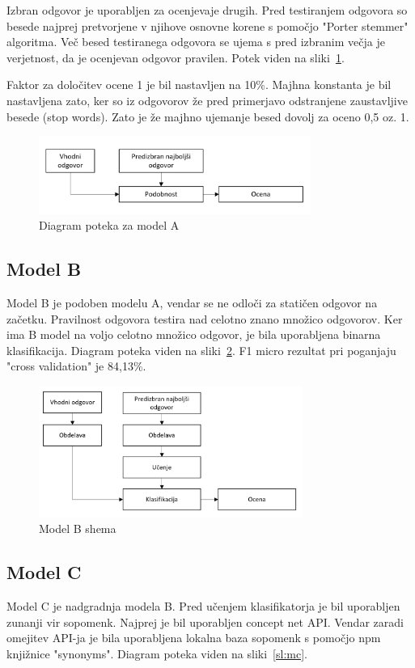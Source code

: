 \documentclass[journal]{IEEEtran}
\begin{document}
Izbran odgovor je uporabljen za ocenjevaje drugih. Pred testiranjem odgovora so besede najprej pretvorjene v njihove osnovne korene s pomočjo "Porter stemmer" algoritma. Več besed testiranega odgovora se ujema s pred izbranim večja je verjetnost, da je ocenjevan odgovor pravilen. Potek viden na sliki~\ref{sl:ma}. 

Faktor za določitev ocene 1 je bil nastavljen na 10\%. Majhna konstanta je bil nastavljena zato, ker so iz odgovorov že pred primerjavo odstranjene zaustavljive besede (stop words). Zato je že majhno ujemanje besed dovolj za oceno 0,5 oz. 1.

\begin{figure}[h]
	\centering
	\includegraphics[width=3.5in]{A}
	\caption{Diagram poteka za model A}
	\label{sl:ma}
\end{figure}

\subsection{Model B}
Model B je podoben modelu A, vendar se ne odloči za statičen odgovor na začetku. Pravilnost odgovora testira nad celotno znano množico odgovorov. Ker ima B model na voljo celotno množico odgovor, je bila uporabljena binarna klasifikacija. Diagram poteka viden na sliki~\ref{sl:mb}. F1 micro rezultat pri poganjaju "cross validation" je 84,13\%.

\begin{figure}[h]
	\centering
	\includegraphics[width=3.4in]{B}
	\caption{Model B shema}
	\label{sl:mb}
\end{figure}

\subsection{Model C}
Model C je nadgradnja modela B. Pred učenjem klasifikatorja je bil uporabljen zunanji vir sopomenk. Najprej je bil uporabljen concept net API. Vendar zaradi omejitev API-ja je bila uporabljena lokalna baza sopomenk s pomočjo npm knjižnice "synonyms". Diagram poteka viden na sliki~\ref{sl:mc}.
\end{document}
